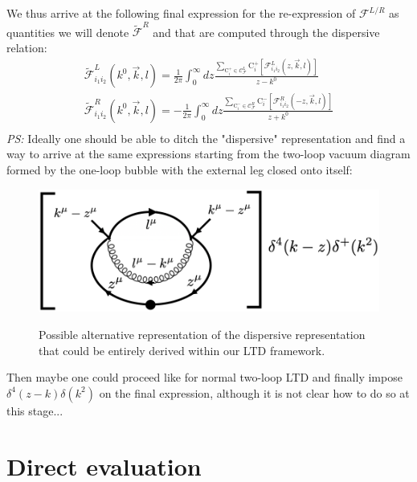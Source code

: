 \documentclass[11pt]{article}
\begin{document}
We thus arrive at the following final expression for the re-expression of $\mathcal{F}^{L/R}$ as quantities we will denote $\mathcal{\tilde{F}}^{R}$ and that are computed through the dispersive relation:
\begin{eqnarray}
\label{dispertionRelationApplied}
\mathcal{\tilde{F}}^{L}_{i_1i_2}(k^0, \vec{k},l) = \frac{1}{2\pi} \int_{0}^\infty d z \frac{ \sum_{\textrm{C}^+_i\in\mathcal{C}_\mathcal{F}^{L}} \textrm{C}^+_i\left[ \mathcal{F}^{L}_{i_1i_2}(z, \vec{k},l)\right ] }{z-k^0} \nonumber\\
\mathcal{\tilde{F}}^{R}_{i_1i_2}(k^0, \vec{k},l) = -\frac{1}{2\pi} \int_{0}^\infty d z \frac{ \sum_{\textrm{C}^-_i\in\mathcal{C}_\mathcal{F}^{R}} \textrm{C}^-_i\left[ \mathcal{F}^{R}_{i_1i_2}(-z, \vec{k},l)\right ] }{z+k^0} \nonumber\\
\end{eqnarray} 
\emph{PS:} Ideally one should be able to ditch the "dispersive" representation and find a way to arrive at the same expressions starting from the two-loop vacuum diagram formed by the one-loop bubble with the external leg closed onto itself:
\begin{figure}[ht!]
\begin{center}
\begin{minipage}{0.75\linewidth}
\centering
{\includegraphics[width=1\linewidth]{LTD_instead_of_dispersive.png}}
\end{minipage}\hfill
{\caption{\label{DispersiveAlternative} Possible alternative representation of the dispersive representation that could be entirely derived within our LTD framework.}}
\end{center}
\end{figure}
Then maybe one could proceed like for normal two-loop LTD and finally impose $\delta^4(z-k)\delta(k^2)$ on the final expression, although it is not clear how to do so at this stage...
\section{Direct evaluation}
\end{document}
